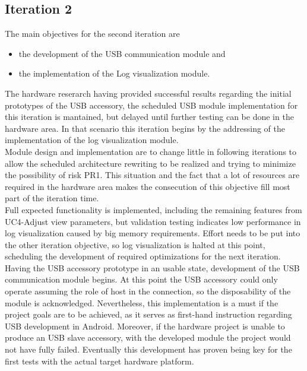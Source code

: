 			
		\subsection{Iteration 2}

			The main objectives for the second iteration are
			\begin{itemize} 
				\item the development of the USB communication module and
				\item the implementation of the Log visualization module.
			\end{itemize}

			The hardware reserarch having provided successful results regarding the initial prototypes of the USB accessory, the scheduled USB module implementation for this iteration is mantained, but delayed until further testing can be done in the hardware area.
			In that scenario this iteration begins by the addressing of the implementation of the log visualization module. \\

			Module design and implementation are to change little in following iterations to allow the scheduled architecture rewriting to be realized and trying to minimize the possibility of risk PR1. This situation and the fact that a lot of resources are required in the hardware area makes the consecution of this objective fill most part of the iteration time.\\

			Full expected functionality is implemented, including the remaining features from UC4-Adjust view parameters, but validation testing indicates low performance in log visualization caused by big memory requirements. Effort needs to be put into the other iteration objective, so log visualization is halted at this point, scheduling the development of required optimizations for the next iteration.\\

			Having the USB accessory prototype in an usable state, development of the USB communication module begins. At this point the USB accessory could only operate assuming the role of host in the connection, so the disposability of the module is acknowledged. Nevertheless, this implementation is a must if the project goals are to be achieved, as it serves as first-hand instruction regarding USB development in Android. Moreover, if the hardware project is unable to produce an USB slave accessory, with the developed module the project would not have fully failed. Eventually this development has proven being key for the first tests with the actual target hardware platform.\\


